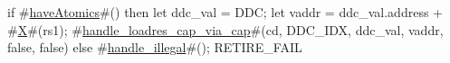 if #\hyperref[sailRISCVzhaveAtomics]{haveAtomics}#() then {
  let ddc_val = DDC;
  let vaddr = ddc_val.address + #\hyperref[sailRISCVzX]{X}#(rs1);
  #\hyperref[sailRISCVzhandlezyloadreszycapzyviazycap]{handle\_loadres\_cap\_via\_cap}#(cd, DDC_IDX, ddc_val, vaddr, false, false)
} else {
  #\hyperref[sailRISCVzhandlezyillegal]{handle\_illegal}#();
  RETIRE_FAIL
}
